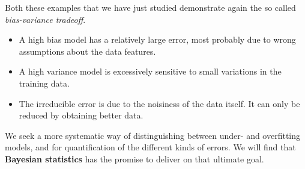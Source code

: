 \documentclass[%
oneside,                 %
final,                   %
10pt]{article}
\begin{document}
\noindent
Both these examples that we have just studied demonstrate again the so called \emph{bias-variance tradeoff}.

\begin{itemize}
 \item A high bias model has a relatively large error, most probably due to wrong assumptions about the data features.

 \item A high variance model is excessively sensitive to small variations in the training data.

 \item The irreducible error is due to the noisiness of the data itself. It can only be reduced by obtaining better data.
\end{itemize}

\noindent
We seek a more systematic way of distinguishing between under- and overfitting models, and for quantification of the different kinds of errors. We will find that \textbf{Bayesian statistics} has the promise to deliver on that ultimate goal.



\end{document}
